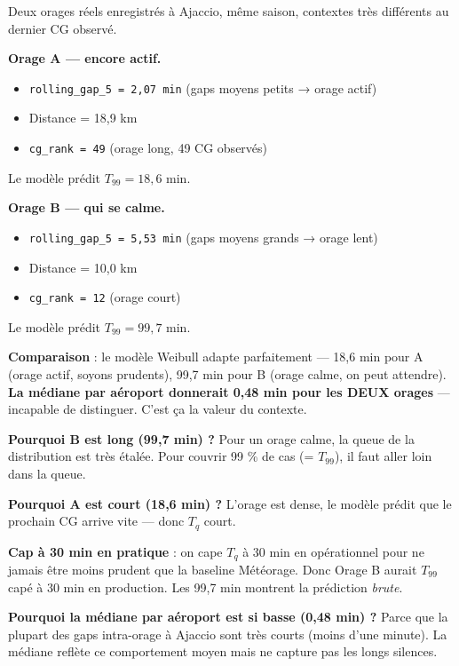 \documentclass[11pt,a4paper]{article}
\begin{document}
\begin{dire}
\og Deux orages réels enregistrés à Ajaccio, même saison, contextes très différents au
dernier CG observé.

\textbf{Orage A — encore actif.}
\begin{itemize}
    \item \texttt{rolling\_gap\_5 = 2,07 min} (gaps moyens petits → orage actif)
    \item Distance = 18,9 km
    \item \texttt{cg\_rank = 49} (orage long, 49 CG observés)
\end{itemize}
Le modèle prédit $T_{99} = 18{,}6$ min.

\textbf{Orage B — qui se calme.}
\begin{itemize}
    \item \texttt{rolling\_gap\_5 = 5,53 min} (gaps moyens grands → orage lent)
    \item Distance = 10,0 km
    \item \texttt{cg\_rank = 12} (orage court)
\end{itemize}
Le modèle prédit $T_{99} = 99{,}7$ min.

\textbf{Comparaison} : le modèle Weibull adapte parfaitement — 18,6 min pour A (orage
actif, soyons prudents), 99,7 min pour B (orage calme, on peut attendre).
\textbf{La médiane par aéroport donnerait 0,48 min pour les DEUX orages} — incapable de
distinguer. C'est ça la valeur du contexte. \fg{}
\end{dire}

\begin{compr}
\textbf{Pourquoi B est long (99,7 min) ?} Pour un orage calme, la queue de la distribution
est très étalée. Pour couvrir 99 \% de cas (= $T_{99}$), il faut aller loin dans la queue.

\textbf{Pourquoi A est court (18,6 min) ?} L'orage est dense, le modèle prédit que le
prochain CG arrive vite — donc $T_q$ court.

\textbf{Cap à 30 min en pratique} : on cape $T_q$ à 30 min en opérationnel pour ne jamais
être moins prudent que la baseline Météorage. Donc Orage B aurait $T_{99}$ capé à 30 min
en production. Les 99,7 min montrent la prédiction \emph{brute}.

\textbf{Pourquoi la médiane par aéroport est si basse (0,48 min) ?} Parce que la plupart
des gaps intra-orage à Ajaccio sont très courts (moins d'une minute). La médiane reflète
ce comportement moyen mais ne capture pas les longs silences.
\end{compr}
\end{document}
